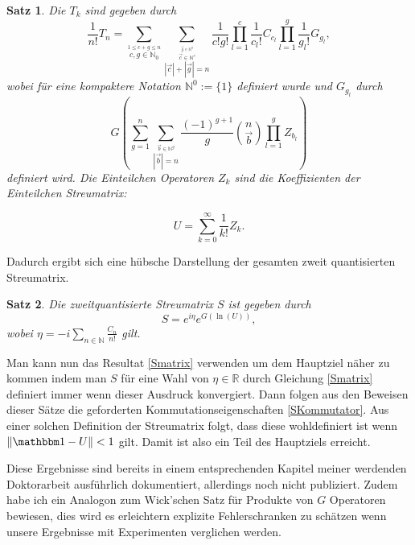 \documentclass[a4paper,12pt]{article}
\newtheorem{satz}{Satz}
\newcommand{\id}{{\mathbbm 1}}
\begin{document}
\begin{satz}
Die \(T_k\) sind gegeben durch
\begin{equation}
\frac{1}{n!} T_n = \sum_{\stackrel{1\le c+g\le n}{c,g\in\mathbb{N}_0}} 
\sum_{\stackrel{\stackrel{\vec{g}\in\mathbb{N}^g}{\vec{c}\in\mathbb{N}^c}}{|\vec{c}| + |\vec{g}|=n}} 
\frac{1}{c! g!} \prod_{l=1}^c \frac{1}{c_l!} C_{c_l} \prod_{l=1}^g \frac{1}{g_l!} G_{g_l},
\end{equation}
wobei für eine kompaktere Notation \(\mathbb{N}^0:= \{1\}\) definiert wurde und \(G_{g_l}\) durch
\begin{equation}
G\left( \sum_{g=1}^n \sum_{\stackrel{\vec{b}\in\mathbb{N}^g}{|\vec{b}|=n}}\frac{(-1)^{g+1}}{g} 
\binom{n}{\vec{b}} \prod_{l=1}^g Z_{b_l}  \right)
\end{equation}
definiert wird. Die Einteilchen Operatoren \(Z_k\) sind die Koeffizienten der Einteilchen Streumatrix:

\begin{equation}
U=\sum_{k=0}^\infty \frac{1}{k!} Z_k.
\end{equation}
\end{satz}
Dadurch ergibt sich eine hübsche Darstellung der gesamten zweit quantisierten Streumatrix.

\begin{satz}
Die zweitquantisierte Streumatrix \(S\) ist gegeben durch
\begin{equation}\label{Smatrix}
S= e^{i \eta} e^{G(\ln (U))},
\end{equation}
wobei \(\eta=-i\sum_{n\in\mathbb{N}}\frac{C_n}{n!}\) gilt.
\end{satz}


Man kann nun das Resultat \eqref{Smatrix} verwenden um dem Hauptziel näher zu kommen indem man
\(S\) für eine Wahl von \(\eta\in\mathbb{R}\)
 durch Gleichung \eqref{Smatrix} definiert immer wenn dieser Ausdruck konvergiert.
Dann folgen aus den Beweisen dieser Sätze die geforderten Kommutationseigenschaften
\eqref{SKommutator}. Aus einer solchen Definition der Streumatrix folgt, dass diese
wohldefiniert ist wenn \(\|\id-U\|<1\) gilt. Damit ist also ein Teil des Hauptziels erreicht.

Diese Ergebnisse sind bereits in einem entsprechenden Kapitel meiner werdenden Doktorarbeit
 ausführlich dokumentiert, allerdings noch nicht publiziert.
Zudem habe ich ein Analogon zum Wick'schen Satz für Produkte von \(G\) Operatoren bewiesen, dies
wird es erleichtern explizite Fehlerschranken zu schätzen wenn unsere Ergebnisse mit Experimenten
verglichen werden.
\end{document}

